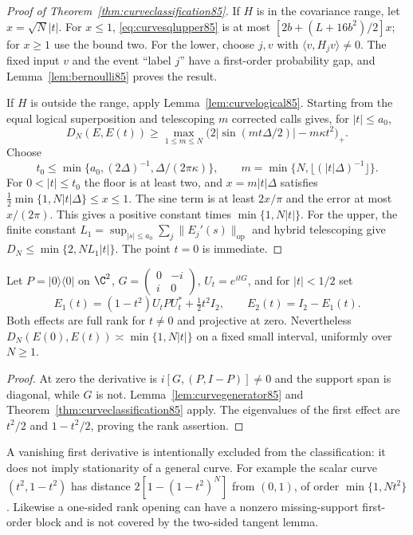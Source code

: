 \begin{proof}[Proof of Theorem~\ref{thm:curveclassification85}]
If $H$ is in the covariance range, let $x=\sqrt N|t|$.
For $x\le1$, \eqref{eq:curvesqlupper85} is at most
$[2b+(L+16b^2)/2]x$; for $x\ge1$ use the bound two.
For the lower, choose $j,v$ with $\langle v,H_jv\rangle\ne0$.
The fixed input $v$ and the event ``label $j$'' have a first-order
probability gap, and Lemma~\ref{lem:bernoulli85} proves the result.

If $H$ is outside the range, apply Lemma~\ref{lem:curvelogical85}.
Starting from the equal logical superposition and telescoping $m$
corrected calls gives, for $|t|\le a_0$,
\begin{equation}\label{eq:curvefinitelower85}
 D_N(E,E(t))\ge
 \max_{1\le m\le N}\bigl(2|\sin(mt\Delta/2)|-m\kappa t^2\bigr)_+.
\end{equation}
Choose
\[
 t_0\le\min\{a_0,(2\Delta)^{-1},\Delta/(2\pi\kappa)\},\qquad
 m=\min\{N,\lfloor(|t|\Delta)^{-1}\rfloor\}.
\]
For $0<|t|\le t_0$ the floor is at least two, and
$x=m|t|\Delta$ satisfies
$\tfrac12\min\{1,N|t|\Delta\}\le x\le1$.
The sine term is at least $2x/\pi$ and the error at most $x/(2\pi)$.
This gives a positive constant times $\min\{1,N|t|\}$.
For the upper, the finite constant
$L_1=\sup_{|s|\le a_0}\sum_j\|E_j'(s)\|_{\mathrm{op}}$
and hybrid telescoping give $D_N\le\min\{2,NL_1|t|\}$.
The point $t=0$ is immediate.
\end{proof}

\begin{corollary}\label{cor:rankopening85}
Let $P=|0\rangle\langle0|$ on $\C^2$,
$G=\left(\begin{smallmatrix}0&-i\\i&0\end{smallmatrix}\right)$,
$U_t=e^{itG}$, and for $|t|<1/2$ set
\[
 E_1(t)=(1-t^2)U_tPU_t^*+\tfrac12t^2I_2,
 \qquad E_2(t)=I_2-E_1(t).
\]
Both effects are full rank for $t\ne0$ and projective at zero.
Nevertheless $D_N(E(0),E(t))\asymp\min\{1,N|t|\}$ on a fixed
small interval, uniformly over $N\ge1$.
\end{corollary}
\begin{proof}
At zero the derivative is $i[G,(P,I-P)]\ne0$ and the support span
is diagonal, while $G$ is not.  Lemma~\ref{lem:curvegenerator85}
and Theorem~\ref{thm:curveclassification85} apply.  The eigenvalues
of the first effect are $t^2/2$ and $1-t^2/2$, proving the rank assertion.
\end{proof}
A vanishing first derivative is intentionally excluded from the
classification: it does not imply stationarity of a general curve.
For example the scalar curve $(t^2,1-t^2)$ has distance
$2[1-(1-t^2)^N]$ from $(0,1)$, of order $\min\{1,Nt^2\}$.
Likewise a one-sided rank opening can have a nonzero missing-support
first-order block and is not covered by the two-sided tangent lemma.
